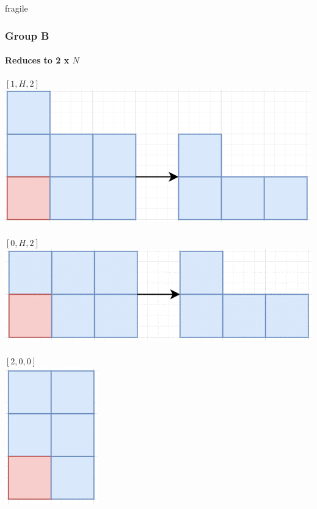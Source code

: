 \documentclass[aspectratio=169,usenames,dvipsnames]{beamer}
\begin{document}
\begin{frame}{fragile}
    \frametitle{Group B}
    \framesubtitle{Reduces to 2 x $N$}
    
    \begin{multicols}{2}
    $[1, H, 2]$\\
    \includegraphics[scale=.4]{[1, H, 2].png}\\
    $  $\\
    $[0, H, 2]$\\
    \includegraphics[scale=.4]{[0, H, 2].png}\\
    $  $\\
    $[2, 0, 0]$\\
    \includegraphics[scale=.4]{[2, 0, 0].png}\\
    $  $\\
    $  $\\
    $  $\\
    \end{multicols}
\end{frame}
\end{document}
